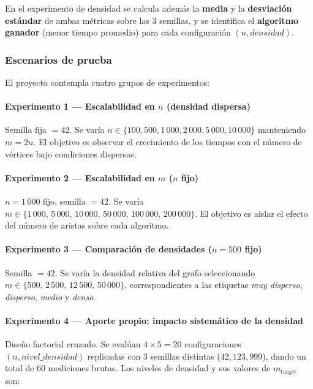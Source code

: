 \noindent En el experimento de densidad se calcula además la \textbf{media}
y la \textbf{desviación estándar} de ambas métricas sobre las 3 semillas,
y se identifica el \textbf{algoritmo ganador} (menor tiempo promedio) para
cada configuración $(n, \textit{densidad})$.

\subsubsection{Escenarios de prueba}

El proyecto contempla cuatro grupos de experimentos:

\paragraph{Experimento 1 — Escalabilidad en $n$ (densidad dispersa)}
Semilla fija $= 42$. Se varía $n \in \{100, 500, 1\,000, 2\,000, 5\,000,
10\,000\}$ manteniendo $m = 2n$. El objetivo es observar el crecimiento de
los tiempos con el número de vértices bajo condiciones dispersas.

\paragraph{Experimento 2 — Escalabilidad en $m$ ($n$ fijo)}
$n = 1\,000$ fijo, semilla $= 42$. Se varía $m \in \{1\,000,\, 5\,000,\,
10\,000,\, 50\,000,\, 100\,000,\, 200\,000\}$. El objetivo es aislar el
efecto del número de aristas sobre cada algoritmo.

\paragraph{Experimento 3 — Comparación de densidades ($n = 500$ fijo)}
Semilla $= 42$. Se varía la densidad relativa del grafo seleccionando
$m \in \{500,\, 2\,500,\, 12\,500,\, 50\,000\}$, correspondientes a las
etiquetas \textit{muy disperso}, \textit{disperso}, \textit{medio} y
\textit{denso}.

\paragraph{Experimento 4 — Aporte propio: impacto sistemático de la densidad}
Diseño factorial cruzado. Se evalúan $4 \times 5 = 20$ configuraciones
$(n, \textit{nivel\_densidad})$ replicadas con $3$ semillas distintas
($42, 123, 999$), dando un total de $60$ mediciones brutas.
Los niveles de densidad y sus valores de $m_{\text{target}}$ son:

